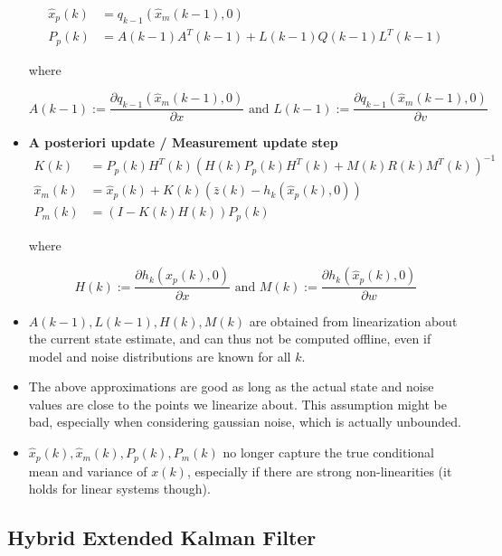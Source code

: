 \documentclass[10pt,a4paper]{scrartcl}
\begin{document}
\begin{multicols*}{2}
\begin{multicols*}{3}
\begin{itemize}
\begin{align*}
\hat{x}_p(k)&=q_{k-1}(\hat{x}_m(k-1),0)\\
P_p(k)&=A(k-1)A^T(k-1)+L(k-1)Q(k-1)L^T(k-1)
\end{align*}

where 

\begin{equation*}
A(k-1):=\frac{\partial q_{k-1}(\hat{x}_m(k-1),0)}{\partial x}\text{ and }L(k-1):=\frac{\partial q_{k-1}(\hat{x}_m(k-1),0)}{\partial v}
\end{equation*}
\item \textbf{A posteriori update / Measurement update step}
\begin{align*}
K(k)&=P_p(k)H^T(k)(H(k)P_p(k)H^T(k)+M(k)R(k)M^T(k))^{-1}\\
\hat{x}_m(k)&=\hat{x}_p(k)+K(k)(\bar{z}(k)-h_k(\hat{x}_p(k),0))\\
P_m(k)&=(I-K(k)H(k))P_p(k)
\end{align*}

where

\begin{equation*}
H(k):=\frac{\partial h_k(\hat{x}_p(k),0)}{\partial x}\text{ and }M(k):=\frac{\partial h_k(\hat{x}_p(k),0)}{\partial w}
\end{equation*}
\item $A(k-1), L(k-1), H(k), M(k)$ are obtained from linearization about the current state estimate, and can thus not be computed offline, even if model and noise distributions are known for all $k$.
\item The above approximations are good as long as the actual state and noise values are close to the points we linearize about. This assumption might be bad, especially when considering gaussian noise, which is actually unbounded.
\item $\hat{x}_p(k),\hat{x}_m(k),P_p(k),P_m(k)$ no longer capture the true conditional mean and variance of $x(k)$, especially if there are strong non-linearities (it holds for linear systems though).
\end{itemize}

\subsection{Hybrid Extended Kalman Filter}



\end{multicols*}
\end{multicols*}
\end{document}
